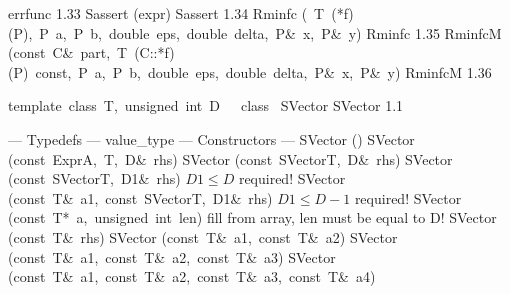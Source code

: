 \documentclass{article}
\begin{document}
\begin{cxxentry}
\begin{cxxnames}
        {errfunc}
        {1.33}
        {Sassert}
        {(expr)}
        {Sassert}
        {1.34}
        {Rminfc}
        {(\ T\ (*f)(P),\ P\ a,\ P\ b,\ double\ eps,\ double\ delta,\ P\&\ x,\ P\&\ y)}
        {Rminfc}
        {1.35}
        {RminfcM}
        {(const\ C\&\ part,\ T\ (C::*f)(P)\ const,\ P\ a,\ P\ b,\ double\ eps,\ double\ delta,\ P\&\ x,\ P\&\ y)}
        {RminfcM}
        {1.36}
\end{cxxnames}
\begin{cxxdoc}

\end{cxxdoc}
\begin{cxxclass}
{template\ \<class\ T,\ unsigned\ int\ D\>\ \ \ class\ }
        {SVector}
        {}
        {SVector
}
        {1.1}
\begin{cxxpublic}
\cxxitem{}
        {--- Typedefs --- }
        {}
        {}
        {}
\label{cxx.1.1.1}
        {value\_type}
        {}
        {}
        {}
\label{cxx.1.1.2}
\cxxitem{}
        {--- Constructors --- }
        {}
        {}
        {}
\label{cxx.1.1.3}
\cxxitem{}
        {SVector}
        {()}
        {}
        {}
\label{cxx.1.1.4}
        {SVector}
        {(const\ Expr\<A,\ T,\ D\>\&\ rhs)}
        {}
        {}
\label{cxx.1.1.5}
\cxxitem{}
        {SVector}
        {(const\ SVector\<T,\ D\>\&\ rhs)}
        {}
        {}
\label{cxx.1.1.6}
        {SVector}
        {(const\ SVector\<T,\ D1\>\&\ rhs)}
        { $D1\le D$ required!}
        {}
\label{cxx.1.1.7}
        {SVector}
        {(const\ T\&\ a1,\ const\ SVector\<T,\ D1\>\&\ rhs)}
        { $D1\le D-1$ required!}
        {}
\label{cxx.1.1.8}
\cxxitem{}
        {SVector}
        {(const\ T*\ a,\ unsigned\ int\ len)}
        { fill from array, len must be equal to D!}
        {}
\label{cxx.1.1.9}
\cxxitem{}
        {SVector}
        {(const\ T\&\ rhs)}
        {}
        {}
\label{cxx.1.1.10}
\cxxitem{}
        {SVector}
        {(const\ T\&\ a1,\ const\ T\&\ a2)}
        {}
        {}
\label{cxx.1.1.11}
\cxxitem{}
        {SVector}
        {(const\ T\&\ a1,\ const\ T\&\ a2,\ const\ T\&\ a3)}
        {}
        {}
\label{cxx.1.1.12}
\cxxitem{}
        {SVector}
        {(const\ T\&\ a1,\ const\ T\&\ a2,\ const\ T\&\ a3,\ const\ T\&\ a4)}
        {}
        {}

\end{cxxpublic}
\end{cxxclass}
\end{cxxentry}
\end{document}
